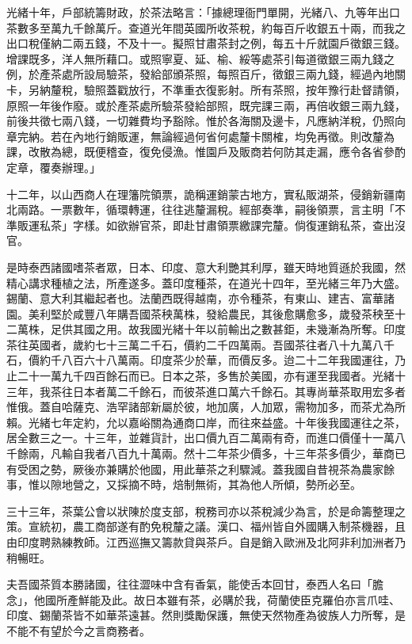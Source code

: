 \begin{pinyinscope}
光緒十年，戶部統籌財政，於茶法略言：「據總理衙門單開，光緒八、九等年出口茶數多至萬九千餘萬斤。查道光年間英國所收茶稅，約每百斤收銀五十兩，而我之出口稅僅納二兩五錢，不及十一。擬照甘肅茶封之例，每五十斤就園戶徵銀三錢。增課既多，洋人無所藉口。或照寧夏、延、榆、綏等處茶引每道徵銀三兩九錢之例，於產茶處所設局驗茶，發給部頒茶照，每照百斤，徵銀三兩九錢，經過內地關卡，另納釐稅，驗照蓋戳放行，不準重衣復影射。所有茶照，按年豫行赴督請領，原照一年後作廢。或於產茶處所驗茶發給部照，既完課三兩，再倍收銀三兩九錢，前後共徵七兩八錢，一切雜費均予豁除。惟於各海關及邊卡，凡應納洋稅，仍照向章完納。若在內地行銷販運，無論經過何省何處釐卡關榷，均免再徵。則改釐為課，改散為總，既便稽查，復免侵漁。惟園戶及販商若何防其走漏，應令各省參酌定章，覆奏辦理。」

十二年，以山西商人在理籓院領票，詭稱運銷蒙古地方，實私販湖茶，侵銷新疆南北兩路。一票數年，循環轉運，往往逃釐漏稅。經部奏準，嗣後領票，言主明「不準販運私茶」字樣。如欲辦官茶，即赴甘肅領票繳課完釐。倘復運銷私茶，查出沒官。

是時泰西諸國嗜茶者眾，日本、印度、意大利艷其利厚，雖天時地質遜於我國，然精心講求種植之法，所產遂多。蓋印度種茶，在道光十四年，至光緒三年乃大盛。錫蘭、意大利其繼起者也。法蘭西既得越南，亦令種茶，有東山、建吉、富華諸園。美利堅於咸豐八年購吾國茶秧萬株，發給農民，其後愈購愈多，歲發茶秧至十二萬株，足供其國之用。故我國光緒十年以前輸出之數甚鉅，未幾漸為所奪。印度茶往英國者，歲約七十三萬二千石，價約二千四萬兩。吾國茶往者八十九萬八千石，價約千八百六十八萬兩。印度茶少於華，而價反多。迨二十二年我國運往，乃止二十一萬九千四百餘石而已。日本之茶，多售於美國，亦有運至我國者。光緒十三年，我茶往日本者萬二千餘石，而彼茶進口萬六千餘石。其專尚華茶取用宏多者惟俄。蓋自哈薩克、浩罕諸部新屬於彼，地加廣，人加眾，需物加多，而茶尤為所賴。光緒七年定約，允以嘉峪關為通商口岸，而往來益盛。十年後我國運往之茶，居全數三之一。十三年，並雜貨計，出口價九百二萬兩有奇，而進口價僅十一萬八千餘兩，凡輸自我者八百九十萬兩。然十二年茶少價多，十三年茶多價少，華商已有受困之勢，厥後亦兼購於他國，用此華茶之利驟減。蓋我國自昔視茶為農家餘事，惟以隙地營之，又採摘不時，焙制無術，其為他人所傾，勢所必至。

三十三年，茶葉公會以狀陳於度支部，稅務司亦以茶稅減少為言，於是命籌整理之策。宣統初，農工商部遂有酌免稅釐之議。漢口、福州皆自外國購入制茶機器，且由印度聘熟練教師。江西巡撫又籌款貸與茶戶。自是銷入歐洲及北阿非利加洲者乃稍暢旺。

夫吾國茶質本勝諸國，往往澀味中含有香氣，能使舌本回甘，泰西人名曰「膽念」，他國所產鮮能及此。故日本雖有茶，必購於我，荷蘭使臣克羅伯亦言爪哇、印度、錫蘭茶皆不如華茶遠甚。然則獎勵保護，無使天然物產為彼族人力所奪，是不能不有望於今之言商務者。


\end{pinyinscope}
